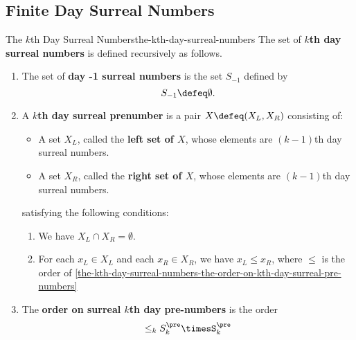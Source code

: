 \subsection{Finite Day Surreal Numbers}\label{subsection-finite-day-surreal-numbers}
\begin{definition}{The $k$th Day Surreal Numbers}{the-kth-day-surreal-numbers}%
    The set of \textbf{$k$th day surreal numbers} is defined recursively as follows.
    \begin{enumerate}
        \item\label{the-kth-day-surreal-numbers-the-minus-one-th-day-surreal-numbers}The set of \textbf{day -1 surreal numbers} is the set $S_{-1}$ defined by
            \[
                S_{-1}%
                \defeq%
                \emptyset.%
            \]%
        \item\label{the-kth-day-surreal-numbers-kth-day-surreal-prenumbers}A \textbf{$k$th day surreal prenumber} is a pair $X\defeq(X_{L},X_{R})$ consisting of:
            \begin{itemize}
                \item A set $X_{L}$, called the \textbf{left set of $X$}, whose elements are $(k-1)$th day surreal numbers.
                \item A set $X_{R}$, called the \textbf{right set of $X$}, whose elements are $(k-1)$th day surreal numbers.
            \end{itemize}
            satisfying the following conditions:
            \begin{enumerate}
                \item\label{the-kth-day-surreal-numbers-kth-day-surreal-numbers-empty-intersection}We have $X_{L}\cap X_{R}=\emptyset$.
                \item\label{the-kth-day-surreal-numbers-kth-day-surreal-numbers-ordering}For each $x_{L}\in X_{L}$ and each $x_{R}\in X_{R}$, we have $x_{L}\leq x_{R}$, where $\leq$ is the order of \cref{the-kth-day-surreal-numbers-the-order-on-kth-day-surreal-pre-numbers}
            \end{enumerate}
        \item\label{the-kth-day-surreal-numbers-the-order-on-kth-day-surreal-pre-numbers}The \textbf{order on surreal $k$th day pre-numbers} is the order
            \[
                \leq_{k}%
                S^{\pre}_{k}%
                \times%
                S^{\pre}_{k}%
\]
\end{enumerate}
\end{definition}

